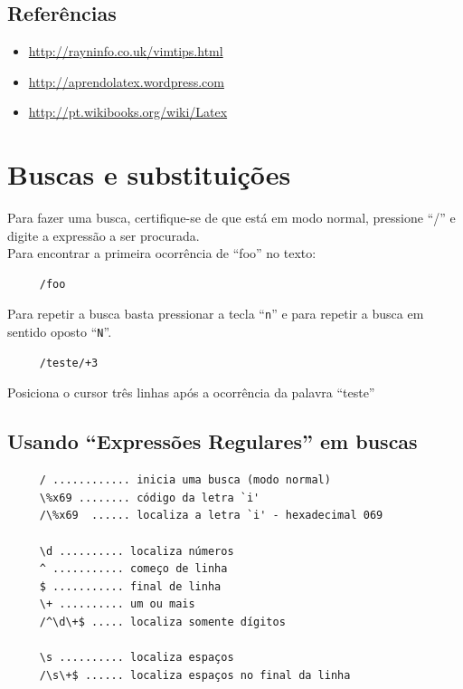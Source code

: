 \documentclass[10pt,a4paper,openany]{book}
\begin{document}
\section{Referências}
\label{Referências}

\begin{itemize}
   \item \url{http://rayninfo.co.uk/vimtips.html}
   \item \url{http://aprendolatex.wordpress.com}
   \item \url{http://pt.wikibooks.org/wiki/Latex}
\end{itemize}

\chapter{Buscas e substituições}\label{Buscas e substituições}

Para fazer uma busca, certifique-se de que está em modo normal,
pressione ``/'' e digite a expressão a ser procurada. \\


Para encontrar a primeira ocorrência de ``foo'' no texto:

\begin{verbatim}
     /foo
\end{verbatim}

Para repetir a busca basta pressionar a tecla ``\verb+n+'' e para
repetir a busca em sentido oposto ``\verb+N+''.

\begin{verbatim}
     /teste/+3
\end{verbatim}

Posiciona o cursor três linhas após a ocorrência da palavra ``teste'' \\


\section{Usando ``Expressões Regulares'' em buscas}

\begin{verbatim}
     / ............ inicia uma busca (modo normal)
     \%x69 ........ código da letra `i'
     /\%x69  ...... localiza a letra `i' - hexadecimal 069
     
     \d .......... localiza números
     ^ ........... começo de linha
     $ ........... final de linha
     \+ .......... um ou mais
     /^\d\+$ ..... localiza somente dígitos
     
     \s .......... localiza espaços
     /\s\+$ ...... localiza espaços no final da linha 
\end{verbatim}
\end{document}
